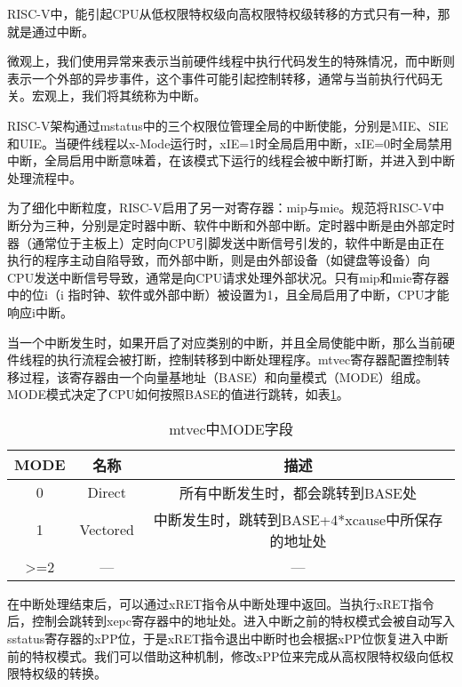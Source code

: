 RISC-V中，能引起CPU从低权限特权级向高权限特权级转移的方式只有一种，那就是通过中断。

微观上，我们使用异常来表示当前硬件线程中执行代码发生的特殊情况，而中断则表示一个外部的异步事件，这个事件可能引起控制转移，通常与当前执行代码无关。宏观上，我们将其统称为中断。

RISC-V架构通过mstatus中的三个权限位管理全局的中断使能，分别是MIE、SIE和UIE。当硬件线程以x-Mode运行时，xIE=1时全局启用中断，xIE=0时全局禁用中断，全局启用中断意味着，在该模式下运行的线程会被中断打断，并进入到中断处理流程中。

为了细化中断粒度，RISC-V启用了另一对寄存器：mip与mie。规范将RISC-V中断分为三种，分别是定时器中断、软件中断和外部中断。定时器中断是由外部定时器（通常位于主板上）定时向CPU引脚发送中断信号引发的，软件中断是由正在执行的程序主动自陷导致，而外部中断，则是由外部设备（如键盘等设备）向CPU发送中断信号导致，通常是向CPU请求处理外部状况。只有mip和mie寄存器中的位i（i 指时钟、软件或外部中断）被设置为1，且全局启用了中断，CPU才能响应i中断。

当一个中断发生时，如果开启了对应类别的中断，并且全局使能中断，那么当前硬件线程的执行流程会被打断，控制转移到中断处理程序。mtvec寄存器配置控制转移过程，该寄存器由一个向量基地址（BASE）和向量模式（MODE）组成。MODE模式决定了CPU如何按照BASE的值进行跳转，如表\ref{tab:mtvec}。

\begin{table}[h]
	\centering
	\setlength{\belowcaptionskip}{2pt}
	\caption{mtvec中MODE字段}
	\label{tab:mtvec}
	\begin{tabular}{|c|c|c|}
		\hline
		MODE             & 名称       & 描述                                        \\ \hline
		0                & Direct   & 所有中断发生时，都会跳转到BASE处                        \\ \hline
		1                & Vectored & 中断发生时，跳转到BASE+4*xcause中所保存的地址处 \\ \hline
		\textgreater{}=2 & —        & —                                         \\ \hline
	\end{tabular}
\end{table}

在中断处理结束后，可以通过xRET指令从中断处理中返回。当执行xRET指令后，控制会跳转到xepc寄存器中的地址处。进入中断之前的特权模式会被自动写入 sstatus寄存器的xPP位，于是xRET指令退出中断时也会根据xPP位恢复进入中断前的特权模式。我们可以借助这种机制，修改xPP位来完成从高权限特权级向低权限特权级的转换。

